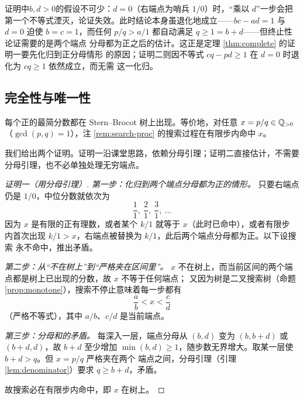 \begin{remark}
证明中$b,d>0$的假设不可少：$d=0$（右端点为哨兵 $1/0$）时，``乘以 $d$''一步会把
第一个不等式湮灭，论证失效。此时结论本身虽退化地成立——$bc-ad=1$ 与 $d=0$ 迫使
$b=c=1$，而任何 $p/q>a/1$ 都自动满足 $q\ge1=b+d$——但终止性论证需要的是两个端点
分母都为正之后的估计。这正是定理 \ref{thm:complete} 的证明一要先化归到正分母情形
的原因；证明二则因不等式 $cq-pd\ge1$ 在 $d=0$ 时退化为 $cq\ge1$ 依然成立，而无需
这一化归。
\end{remark}

\subsection{完全性与唯一性}

\begin{theorem}[完全性]\label{thm:complete}
每个正的最简分数都在 Stern--Brocot 树上出现。等价地，对任意 $x=p/q\in\mathbb{Q}_{>0}$
（$\gcd(p,q)=1$），注 \ref{rem:search-proc} 的搜索过程在有限步内命中 $x$。
\end{theorem}

我们给出两个证明。证明一沿课堂思路，依赖分母引理；证明二直接估计，不需要
分母引理，也不必单独处理无穷端点。

\begin{proof}[证明一（用分母引理）]
\emph{第一步：化归到两个端点分母都为正的情形。}
只要右端点仍是 $1/0$，中位分数就依次为
\[
  \frac11,\ \frac21,\ \frac31,\ \ldots
\]
因为 $x$ 是有限的正有理数，或者某个 $k/1$ 就等于 $x$（此时已命中），或者有限步
内首次出现 $k/1>x$，右端点被替换为 $k/1$，此后两个端点分母都为正。以下设搜索
永不命中，推出矛盾。

\emph{第二步：从``不在树上''到``严格夹在区间里''。}
$x$ 不在树上，而当前区间的两个端点都是树上已出现的分数，故 $x$ 不等于任何端点；
又因为树是二叉搜索树（命题 \ref{prop:monotone}），搜索不停止意味着每一步都有
\[
  \frac ab<x<\frac cd
\]
（严格不等式），其中 $a/b$、$c/d$ 是当前端点。

\emph{第三步：分母和的矛盾。}
每深入一层，端点分母从 $(b,d)$ 变为 $(b,b+d)$ 或 $(b+d,d)$，故 $b+d$ 至少增加
$\min(b,d)\ge1$，随步数无界增大。取某一层使 $b+d>q$。但 $x=p/q$ 严格夹在两个
端点之间，分母引理（引理 \ref{lem:denominator}）要求 $q\ge b+d$，矛盾。

故搜索必在有限步内命中，即 $x$ 在树上。
\end{proof}

